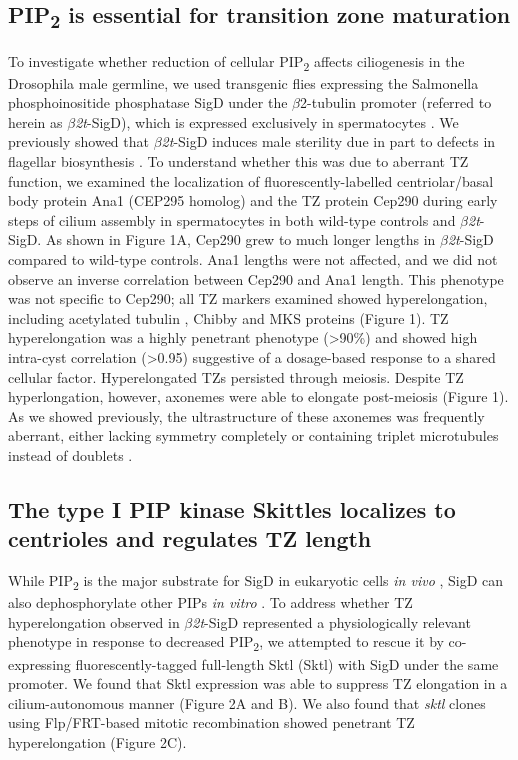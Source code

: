 \documentclass[12pt, twoside, letterpaper]{article}
\newcommand{\PIP}{PIP\textsubscript{2}}
\newcommand{\sigd}{$\beta$\textit{2t}-SigD}
\begin{document}
\subsection{\PIP{} is essential for transition zone maturation}
To investigate whether reduction of cellular \PIP{} affects ciliogenesis in the
Drosophila male germline,
we used transgenic flies expressing the Salmonella phosphoinositide phosphatase SigD
under the $\beta$2-tubulin promoter (referred to herein as \sigd{}),
which is expressed exclusively in spermatocytes
\citep{wei2008depletion, fabian2010phosphatidylinositol}.
We previously showed that \sigd{} induces male sterility
due in part to defects in flagellar biosynthesis \citep{wei2008depletion}.
To understand whether this was due to aberrant TZ function,
we examined the localization of fluorescently-labelled
centriolar/basal body protein
Ana1 (CEP295 homolog) \citep{goshima2007genes, blachon2009proximal}
and the TZ protein Cep290 \citep{basiri2014migrating}
during early steps of cilium assembly in spermatocytes in both
wild-type controls and \sigd{}.
As shown in Figure 1A, Cep290 grew to much longer lengths in \sigd{}
compared to wild-type controls.
Ana1 lengths were not affected, and we did not observe an inverse
correlation between Cep290 and Ana1 length.
This phenotype was not specific to Cep290;
all TZ markers examined showed hyperelongation, including
acetylated tubulin \citep{gottardo2013cilium},
Chibby \citep{enjolras2012drosophila} and
MKS \citep{slaats2015mks1, vieillard2016transition} proteins (Figure 1).
TZ hyperelongation was a highly penetrant phenotype (\textgreater 90\%)
and showed high intra-cyst correlation (\textgreater 0.95) suggestive
of a dosage-based response to a shared cellular factor.
Hyperelongated TZs persisted through meiosis.
Despite TZ hyperlongation, however, axonemes were able to
elongate post-meiosis (Figure 1).
As we showed previously, the ultrastructure of these axonemes
was frequently aberrant,
either lacking symmetry completely or containing triplet microtubules instead of doublets
\citep{wei2008depletion}.

\subsection{The type I PIP kinase Skittles localizes to centrioles and regulates TZ length}
While \PIP{} is the major substrate for SigD in eukaryotic cells \textit{in vivo}
\citep{terebiznik2002elimination, zhou2001salmonella, sengupta2013depletion},
SigD can also dephosphorylate other PIPs \textit{in vitro}
\citep{norris1998sopb}.
To address whether TZ hyperelongation observed in \sigd{} represented a
physiologically relevant phenotype in response to decreased \PIP{},
we attempted to rescue it by
co-expressing fluorescently-tagged full-length Sktl (Sktl) with SigD
under the same promoter.
We found that Sktl expression was able to suppress TZ elongation in a cilium-autonomous
manner (Figure 2A and B).
We also found that \textit{sktl} clones using Flp/FRT-based mitotic recombination
showed penetrant TZ hyperelongation (Figure 2C).
\end{document}
